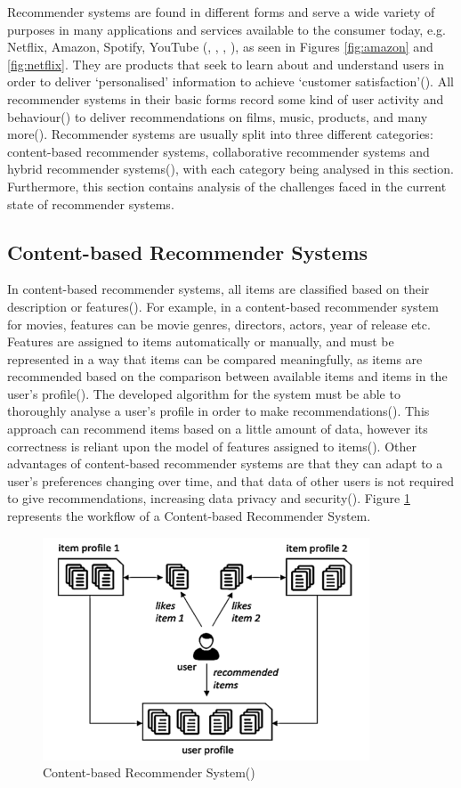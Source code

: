\documentclass{l4proj}
\begin{document}
Recommender systems are found in different forms and serve a wide variety of purposes in many applications and services available to the consumer today, e.g. Netflix, Amazon, Spotify, YouTube (\cite{NflixResearch}, \cite{Hardesty_2024}, \cite{SpotifyResearch}, \cite{Goodrow_2021}), as seen in Figures \ref{fig:amazon} and \ref{fig:netflix}. They are products that seek to learn about and understand users in order to deliver `personalised' information to achieve `customer satisfaction'(\cite{Karakayali_Kostem_Galip_2017}). All recommender systems in their basic forms record some kind of user activity and behaviour(\cite{Paul_Kundu_2019}) to deliver recommendations on films, music, products, and many more(\cite{Yedidi_2023}). Recommender systems are usually split into three different categories: content-based recommender systems, collaborative recommender systems and hybrid recommender systems(\cite{Roy_Dutta_2022}), with each category being analysed in this section. Furthermore, this section contains analysis of the challenges faced in the current state of recommender systems. 
\subsection{Content-based Recommender Systems}
In content-based recommender systems, all items are classified based on their description or features(\cite{Roy_Dutta_2022}). For example, in a content-based recommender system for movies, features can be movie genres, directors, actors, year of release etc. Features are assigned to items automatically or manually, and must be represented in a way that items can be compared meaningfully, as items are recommended based on the comparison between available items and items in the user's profile(\cite{Paul_Kundu_2019}). The developed algorithm for the system must be able to thoroughly analyse a user's profile in order to make recommendations(\cite{Paul_Kundu_2019}). This approach can recommend items based on a little amount of data, however its correctness is reliant upon the model of features assigned to items(\cite{Paul_Kundu_2019}). Other advantages of content-based recommender systems are that they can adapt to a user's preferences changing over time, and that data of other users is not required to give recommendations, increasing data privacy and security(\cite{Roy_Dutta_2022}). Figure \ref{fig:content-based} represents the workflow of a Content-based Recommender System.
\begin{figure}
    \centering
    \includegraphics[width=0.55\linewidth]{images/Content-based-RS.png}
    \caption{Content-based Recommender System(\cite{Roy_Dutta_2022})}
    \label{fig:content-based}
\end{figure}
\end{document}
